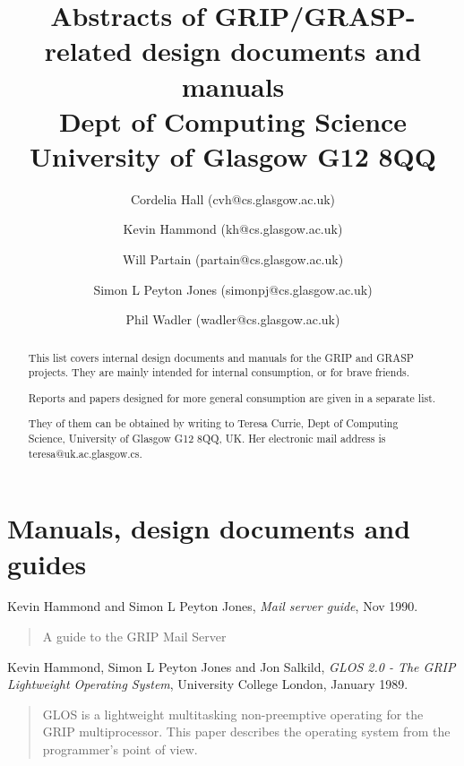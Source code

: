 
\newcommand{\reference}[4]{	%
\large
#1, {\em #2}, #3.
\normalsize
\begin{quotation}
#4
\end{quotation}
\vspace{0.2in}
}

\newcommand{\Haskell}[1]{{\sc Haskell}}



\title{Abstracts of GRIP/GRASP-related design documents and manuals \\
Dept of Computing Science \\
University of Glasgow G12 8QQ}

\author{
Cordelia Hall (cvh@cs.glasgow.ac.uk) \and
Kevin Hammond (kh@cs.glasgow.ac.uk) \and
Will Partain (partain@cs.glasgow.ac.uk) \and
Simon L Peyton Jones (simonpj@cs.glasgow.ac.uk) \and
Phil Wadler (wadler@cs.glasgow.ac.uk) 
}

\maketitle

\begin{abstract}
This list covers internal design documents and manuals for the GRIP
and GRASP projects.
They are mainly intended for internal consumption, or for brave friends.

Reports and papers designed for more general consumption are given in 
a separate list.

They of them can be obtained by writing to 
Teresa Currie, Dept of Computing Science,
University of Glasgow G12 8QQ, UK.   Her electronic mail address is
teresa@uk.ac.glasgow.cs.
\end{abstract}


\section{Manuals, design documents and guides}

\reference{Kevin Hammond and Simon L Peyton Jones}
{Mail server guide}
{Nov 1990}
{
A guide to the GRIP Mail Server
}

\reference{Kevin Hammond, Simon L Peyton Jones and Jon Salkild}
{GLOS 2.0 - The GRIP Lightweight Operating System}
{University College London, January 1989}
{
GLOS is a lightweight multitasking non-preemptive operating 
for the GRIP multiprocessor.
This paper describes the operating system from the programmer's point of
view.
}

